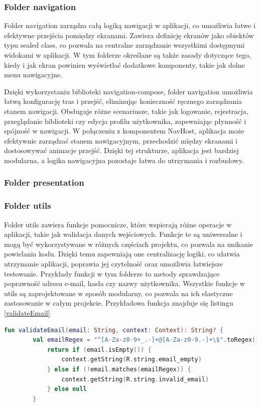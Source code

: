 \documentclass[12pt,twoside]{article}
\begin{document}
\subsubsection{Folder navigation}

Folder navigation zarządza całą logiką nawigacji w aplikacji, co umożliwia łatwe i efektywne przejścia pomiędzy 
ekranami. Zawiera definicję ekranów jako obiektów typu sealed class, co pozwala na centralne zarządzanie wszystkimi 
dostępnymi widokami w aplikacji. W tym folderze określane są także zasady dotyczące tego, kiedy i jak ekran powinien 
wyświetlać dodatkowe komponenty, takie jak dolne menu nawigacyjne.

Dzięki wykorzystaniu biblioteki navigation-compose, folder navigation umożliwia łatwą konfigurację tras i przejść, 
eliminując konieczność ręcznego zarządzania stanem nawigacji. Obsługuje różne scenariusze, takie jak logowanie, 
rejestracja, przeglądanie biblioteki czy edycja profilu użytkownika, zapewniając płynność i spójność w nawigacji. 
W połączeniu z komponentem NavHost, aplikacja może efektywnie zarządzać stanem nawigacyjnym, przechodzić między 
ekranami i dostosowywać animacje przejść. Dzięki tej strukturze, aplikacja jest bardziej modularna, a logika 
nawigacyjna pozostaje łatwa do utrzymania i rozbudowy.

\subsubsection{Folder presentation}



\subsubsection{Folder utils}

Folder utils zawiera funkcje pomocnicze, które wspierają różne operacje w aplikacji, takie jak walidacja danych 
wejściowych. Funkcje te są uniwersalne i mogą być wykorzystywane w różnych częściach projektu, co pozwala na unikanie 
powielania kodu. Dzięki temu zapewniają one centralizację logiki, co ułatwia utrzymanie aplikacji, poprawia jej 
czytelność oraz umożliwia łatwiejsze testowanie. Przykłady funkcji w tym folderze to metody sprawdzające poprawność 
adresu e-mail, hasła czy nazwy użytkownika. Wszystkie funkcje w utils są zaprojektowane w sposób modularny, co 
pozwala na ich elastyczne zastosowanie w całym projekcie. Przykładowa funkcja znajduje się listingu \ref{validateEmail}

\begin{lstlisting}[language=Kotlin,caption=kod funkcji validateEmail, label={validateEmail}]
	fun validateEmail(email: String, context: Context): String? {
    	val emailRegex = "^[A-Za-z0-9+_.-]+@[A-Za-z0-9.-]+\$".toRegex()
    		return if (email.isEmpty()) {
        		context.getString(R.string.email_empty)
    		} else if (!email.matches(emailRegex)) {
        		context.getString(R.string.invalid_email)
    		} else null
		}
\end{lstlisting}
\end{document}
